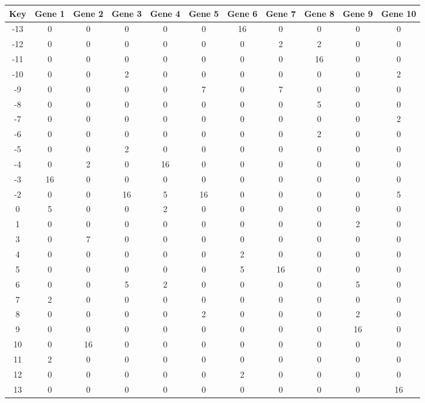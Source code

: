 \begin{tabular}{|c|c|c|c|c|c|c|c|c|c|c|}
\hline
Key & Gene 1 & Gene 2 & Gene 3 & Gene 4 & Gene 5 & Gene 6 & Gene 7 & Gene 8 & Gene 9 & Gene 10 \\
\hline
-13 & 0 & 0 & 0 & 0 & 0 & 16 & 0 & 0 & 0 & 0 \\
-12 & 0 & 0 & 0 & 0 & 0 & 0 & 2 & 2 & 0 & 0 \\
-11 & 0 & 0 & 0 & 0 & 0 & 0 & 0 & 16 & 0 & 0 \\
-10 & 0 & 0 & 2 & 0 & 0 & 0 & 0 & 0 & 0 & 2 \\
-9 & 0 & 0 & 0 & 0 & 7 & 0 & 7 & 0 & 0 & 0 \\
-8 & 0 & 0 & 0 & 0 & 0 & 0 & 0 & 5 & 0 & 0 \\
-7 & 0 & 0 & 0 & 0 & 0 & 0 & 0 & 0 & 0 & 2 \\
-6 & 0 & 0 & 0 & 0 & 0 & 0 & 0 & 2 & 0 & 0 \\
-5 & 0 & 0 & 2 & 0 & 0 & 0 & 0 & 0 & 0 & 0 \\
-4 & 0 & 2 & 0 & 16 & 0 & 0 & 0 & 0 & 0 & 0 \\
-3 & 16 & 0 & 0 & 0 & 0 & 0 & 0 & 0 & 0 & 0 \\
-2 & 0 & 0 & 16 & 5 & 16 & 0 & 0 & 0 & 0 & 5 \\
0 & 5 & 0 & 0 & 2 & 0 & 0 & 0 & 0 & 0 & 0 \\
1 & 0 & 0 & 0 & 0 & 0 & 0 & 0 & 0 & 2 & 0 \\
3 & 0 & 7 & 0 & 0 & 0 & 0 & 0 & 0 & 0 & 0 \\
4 & 0 & 0 & 0 & 0 & 0 & 2 & 0 & 0 & 0 & 0 \\
5 & 0 & 0 & 0 & 0 & 0 & 5 & 16 & 0 & 0 & 0 \\
6 & 0 & 0 & 5 & 2 & 0 & 0 & 0 & 0 & 5 & 0 \\
7 & 2 & 0 & 0 & 0 & 0 & 0 & 0 & 0 & 0 & 0 \\
8 & 0 & 0 & 0 & 0 & 2 & 0 & 0 & 0 & 2 & 0 \\
9 & 0 & 0 & 0 & 0 & 0 & 0 & 0 & 0 & 16 & 0 \\
10 & 0 & 16 & 0 & 0 & 0 & 0 & 0 & 0 & 0 & 0 \\
11 & 2 & 0 & 0 & 0 & 0 & 0 & 0 & 0 & 0 & 0 \\
12 & 0 & 0 & 0 & 0 & 0 & 2 & 0 & 0 & 0 & 0 \\
13 & 0 & 0 & 0 & 0 & 0 & 0 & 0 & 0 & 0 & 16 \\
\hline
\end{tabular}